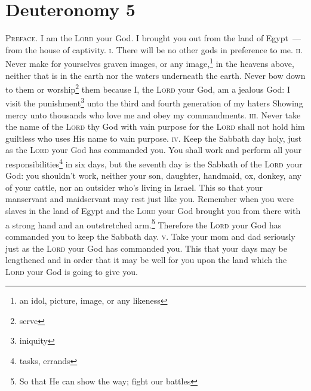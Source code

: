 \section{Deuteronomy 5}\label{Deuteronomy 5}
\begin{enumerate}
     \textsc{Preface.} I am the \textsc{Lord} your God. I brought you out from the land of Egypt~--- from the house of captivity.%
     \textsc{i.} There will be no other gods in preference to me.%
     \textsc{ii.} Never make for yourselves graven images, or any image,\footnote{an idol, picture, image, or any likeness} in the heavens above, neither that is in the earth nor the waters underneath the earth.%
     Never bow down to them or worship\footnote{serve} them because I, the \textsc{Lord} your God, am a jealous God: I visit the punishment\footnote{iniquity} unto the third and fourth generation of my haters%
     Showing mercy unto thousands who love me and obey my commandments.%
     \textsc{iii.} Never take the name of the \textsc{Lord} thy God with vain purpose for the \textsc{Lord} shall not hold him guiltless who uses His name to vain purpose.%
     \textsc{iv.} Keep the Sabbath day holy, just as the \textsc{Lord} your God has commanded you.%
     You shall work and perform all your responsibilities\footnote{tasks, errands} in six days,%
     but the seventh day is the Sabbath of the \textsc{Lord} your God: you shouldn't work, neither your son, daughter, handmaid, ox, donkey, any of your cattle, nor an outsider who's living in Israel. This so that your manservant and maidservant may rest just like you.%
     Remember when you were slaves in the land of Egypt and the \textsc{Lord} your God brought you from there with a strong hand and an outstretched arm.\footnote{So that He can show the way; fight our battles} Therefore the \textsc{Lord} your God has commanded you to keep the Sabbath day.%
     \textsc{v.} Take your mom and dad seriously just as the \textsc{Lord} your God has commanded you. This that your days may be lengthened and in order that it may be well for you upon the land which the \textsc{Lord} your God is going to give you.%

\end{enumerate}
